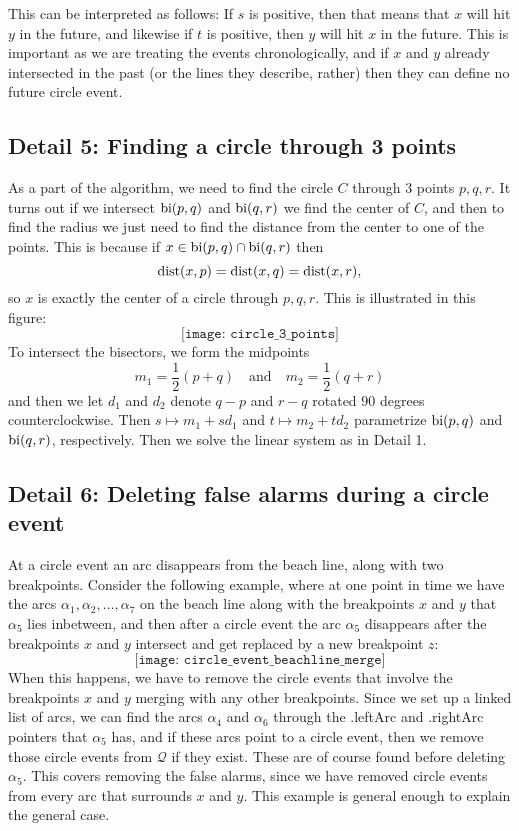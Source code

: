 This can be interpreted as follows: If $s$ is positive, then that means that $x$ will hit $y$ in the future, and likewise if $t$ is positive, then $y$ will hit $x$ in the future. This is important as we are treating the events chronologically, and if $x$ and $y$ already intersected in the past (or the lines they describe, rather) then they can define no future circle event.

\subsection*{Detail 5: Finding a circle through 3 points}
As a part of the algorithm, we need to find the circle $C$ through 3 points $p, q, r$. It turns out if we intersect $\operatorname{bi}(p, q)$ and $\operatorname{bi}(q, r)$ we find the center of $C$, and then to find the radius we just need to find the distance from the center to one of the points. This is because if $x \in \operatorname{bi}(p, q) \cap \operatorname{bi}(q, r)$ then
\[
    \operatorname{dist}(x, p) = \operatorname{dist}(x, q) = \operatorname{dist}(x, r),
\]
so $x$ is exactly the center of a circle through $p, q, r$. This is illustrated in this figure:
\[
    \texttt{[image: circle\_3\_points]}
\]
To intersect the bisectors, we form the midpoints
\[
    m_1 = \frac{1}{2}(p + q) \quad \text{and} \quad m_2 = \frac{1}{2}(q + r)
\]
and then we let $d_1$ and $d_2$ denote $q - p$ and $r - q$ rotated 90 degrees counterclockwise. Then $s \mapsto m_1 + s d_1$ and $t \mapsto m_2 + t d_2$ parametrize $\operatorname{bi}(p, q)$ and $\operatorname{bi}(q, r)$, respectively. Then we solve the linear system as in Detail 1.

\subsection*{Detail 6: Deleting false alarms during a circle event}
At a circle event an arc disappears from the beach line, along with two breakpoints. Consider the following example, where at one point in time we have the arcs $\alpha_1, \alpha_2, \ldots, \alpha_7$ on the beach line along with the breakpoints $x$ and $y$ that $\alpha_5$ lies inbetween, and then after a circle event the arc $\alpha_5$ disappears after the breakpoints $x$ and $y$ intersect and get replaced by a new breakpoint $z$:
\[
    \texttt{[image: circle\_event\_beachline\_merge]}
\]
When this happens, we have to remove the circle events that involve the breakpoints $x$ and $y$ merging with any other breakpoints. Since we set up a linked list of arcs, we can find the arcs $\alpha_4$ and $\alpha_6$ through the \textsf{.leftArc} and \textsf{.rightArc} pointers that $\alpha_5$ has, and if these arcs point to a circle event, then we remove those circle events from $\mathcal{Q}$ if they exist. These are of course found before deleting $\alpha_5$. This covers removing the false alarms, since we have removed circle events from every arc that surrounds $x$ and $y$. This example is general enough to explain the general case.

